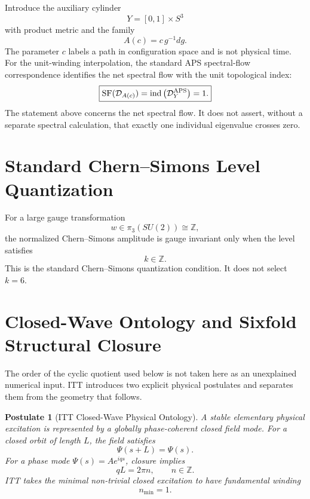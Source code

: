 \documentclass[11pt,a4paper]{article}
\newtheorem{postulate}[definition]{Postulate}
\begin{document}
Introduce the auxiliary cylinder
\begin{equation}
Y=[0,1]\times S^3
\end{equation}
with product metric and the family
\begin{equation}
A(c)=c\,g^{-1}dg.
\end{equation}
The parameter $c$ labels a path in configuration space and is not physical time. For the unit-winding interpolation, the standard APS spectral-flow correspondence identifies the net spectral flow with the unit topological index\cite{APS1975}:
\begin{equation}
\boxed{
\mathrm{SF}(\mathcal D_{A(c)})
=
\mathrm{ind}
\left(\mathcal D_Y^{\rm APS}\right)
=1.
}
\end{equation}
The statement above concerns the net spectral flow. It does not assert, without a separate spectral calculation, that exactly one individual eigenvalue crosses zero.

\section{Standard Chern--Simons Level Quantization}

For a large gauge transformation
\begin{equation}
w\in\pi_3(SU(2))\cong\mathbb Z,
\end{equation}
the normalized Chern--Simons amplitude is gauge invariant only when the level satisfies
\begin{equation}
\boxed{k\in\mathbb Z.}
\end{equation}
This is the standard Chern--Simons quantization condition\cite{Witten1989}. It does not select $k=6$.

\section{Closed-Wave Ontology and Sixfold Structural Closure}

The order of the cyclic quotient used below is not taken here as an unexplained numerical input. ITT introduces two explicit physical postulates and separates them from the geometry that follows.

\begin{postulate}[ITT Closed-Wave Physical Ontology]
A stable elementary physical excitation is represented by a globally phase-coherent closed field mode. For a closed orbit of length $L$, the field satisfies
\begin{equation}
\boxed{
\Psi(s+L)=\Psi(s).
}
\end{equation}
For a phase mode $\Psi(s)=A e^{iqs}$, closure implies
\begin{equation}
qL=2\pi n,\qquad n\in\mathbb Z.
\end{equation}
ITT takes the minimal non-trivial closed excitation to have fundamental winding
\begin{equation}
\boxed{n_{\min}=1.}
\end{equation}
\end{postulate}
\end{document}
